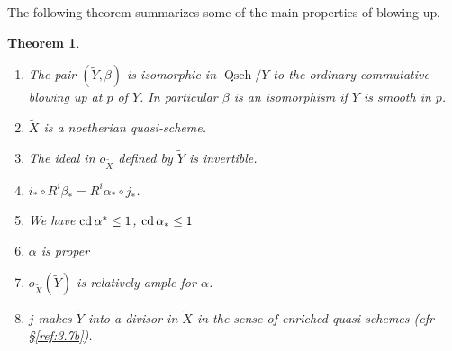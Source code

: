 \documentclass{amsproc}
\def\cd{\mathop{\text{cd}}}
\def\Qsch{\operatorname {Qsch}}
\let\oldtext\text
\def\text#1{\oldtext{\upshape #1}}
\newtheorem{theorems}[lemmas]{Theorem}
\theoremstyle{definition}
\theoremstyle{remark}
\numberwithin{equation}{section}
\numberwithin{table}{section}
\numberwithin{figure}{section}
\begin{document}
The following theorem summarizes some of the main properties
of blowing up.
\begin{theorems} 
\label{ref:6.3.1a}
\begin{enumerate}
\item
The pair $({\tilde{Y}},\beta)$ is isomorphic in $\Qsch/Y$ to the
ordinary commutative blowing up at $p$ of $Y$. In particular $\beta$ is
an isomorphism if $Y$ is smooth in $p$.
\item
${\tilde{X}}$ is a noetherian quasi-scheme.
\item The ideal in $o_{{\tilde{X}}}$ defined by ${\tilde{Y}}$ is invertible.
\item $i_\ast\circ R^i\beta_\ast=R^i\alpha_\ast\circ j_\ast$.
\item We have $
\cd \alpha^\ast\le 1$, $\cd \alpha_\ast\le 1$
\item $\alpha$ is proper
\item $o_{\tilde{X}}({\tilde{Y}})$ is relatively ample for $\alpha$.
\item $j$ makes $\tilde{Y}$ into a divisor in $\tilde{X}$ in the sense
  of enriched quasi-schemes (cfr \S\ref{ref:3.7b}).
\end{enumerate}
\end{theorems}
\end{document}
